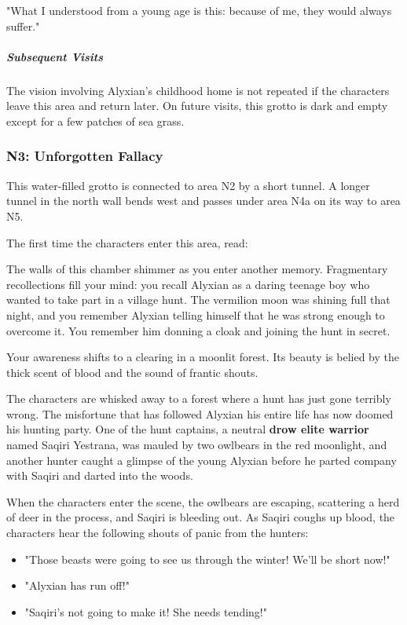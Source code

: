 \documentclass[10pt,a4paper,twoside,bg=print,twocolumn,openany,nodeprecatedcode]{dndbook}
\begin{document}
\begin{DndReadAloud}{}
"What I understood from a young age is this: because of me, they would always suffer."

\end{DndReadAloud}

\subparagraph{Subsequent Visits}
The vision involving Alyxian's childhood home is not repeated if the characters leave this area and return later. On future visits, this grotto is dark and empty except for a few patches of sea grass.

\subsubsection{N3: Unforgotten Fallacy}
This water-filled grotto is connected to area N2 by a short tunnel. A longer tunnel in the north wall bends west and passes under area N4a on its way to area N5.

The first time the characters enter this area, read:

\begin{DndReadAloud}{}
The walls of this chamber shimmer as you enter another memory. Fragmentary recollections fill your mind: you recall Alyxian as a daring teenage boy who wanted to take part in a village hunt. The vermilion moon was shining full that night, and you remember Alyxian telling himself that he was strong enough to overcome it. You remember him donning a cloak and joining the hunt in secret.

Your awareness shifts to a clearing in a moonlit forest. Its beauty is belied by the thick scent of blood and the sound of frantic shouts.

\end{DndReadAloud}

The characters are whisked away to a forest where a hunt has just gone terribly wrong. The misfortune that has followed Alyxian his entire life has now doomed his hunting party. One of the hunt captains, a neutral \textbf{drow elite warrior} named Saqiri Yestrana, was mauled by two owlbears in the red moonlight, and another hunter caught a glimpse of the young Alyxian before he parted company with Saqiri and darted into the woods.

When the characters enter the scene, the owlbears are escaping, scattering a herd of deer in the process, and Saqiri is bleeding out. As Saqiri coughs up blood, the characters hear the following shouts of panic from the hunters:


\begin{itemize}
\item "Those beasts were going to see us through the winter! We'll be short now!"
\item "Alyxian has run off!"
\item "Saqiri's not going to make it! She needs tending!"
\end{itemize}
\end{document}
